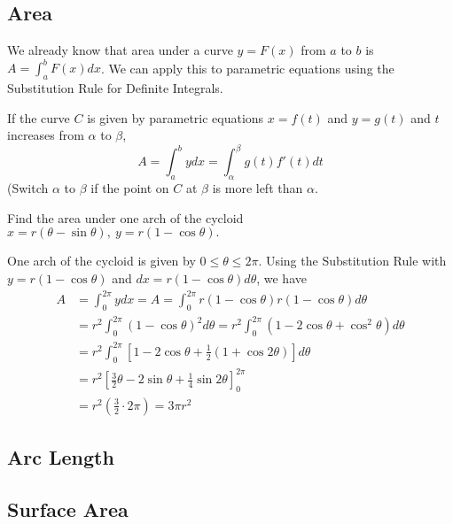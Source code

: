   \subsection*{Area}
    We already know that area under a curve $y=F(x)$ from $a$ to $b$ is $A=\int_{a}^{b} F(x)dx$. We can apply this to parametric equations using the Substitution Rule for Definite Integrals.
    \begin{definition}
      If the curve $C$ is given by parametric equations $x=f(t)$ and $y=g(t)$ and $t$ increases from $\alpha$ to $\beta$,
        $$ A=\int_{a}^{b} ydx = \int_{\alpha}^{\beta} g(t)f'(t)dt $$
      (Switch $\alpha$ to $\beta$ if the point on $C$ at $\beta$ is more left than $\alpha$.
    \end{definition}
    \begin{example}
      Find the area under one arch of the cycloid ${x=r(\theta-\sin\theta),\ y=r(1-\cos\theta)}.$
    \end{example}
    \begin{solution}
      One arch of the cycloid is given by $0 \leq \theta \leq 2\pi$. Using the Substitution Rule with $y=r(1-\cos\theta)$ and $dx=r(1-\cos\theta)d\theta$, we have
      \begin{align*}
        A &= \int_{0}^{2\pi} ydx = A=\int_{0}^{2\pi} r(1-\cos\theta)r(1-\cos\theta)d\theta \\
          &= r^2 \int_{0}^{2\pi} (1-\cos\theta)^2 d\theta = r^2 \int_{0}^{2\pi} (1 - 2 \cos\theta + \cos^2 \theta) d\theta \\
          &= r^2 \int_{0}^{2\pi} \left[1 - 2 \cos\theta + \frac{1}{2}(1+\cos 2\theta)\right] d\theta \\
          &= r^2 \left[ \frac{3}{2}\theta - 2 \sin\theta + \frac{1}{4}\sin2\theta \right]_{0}^{2\pi} \\
          &= r^2 \left( \frac{3}{2} \cdot 2\pi \right) = 3\pi r^2
      \end{align*}
    \end{solution}

  \subsection*{Arc Length}


  \subsection*{Surface Area}
